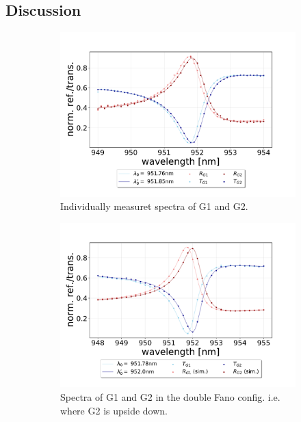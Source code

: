 \subsection{Discussion}

\begin{figure}[h!]
    \centering
    \begin{subfigure}[b]{0.49\textwidth}
        \includegraphics[width=\textwidth]{figures/results/M3:M5/M3:M5_initial_spectra.pdf}
        \caption{Individually measuret spectra of G1 and G2.}
        \label{}
    \end{subfigure}
    \begin{subfigure}[b]{0.49\textwidth}
        \includegraphics[width=\textwidth]{figures/results/M3:M5/M3:M5_spectra_at_measurement.pdf}
        \caption{Spectra of G1 and G2 in the double Fano config. i.e. where G2 is upside down.}
        \label{}
    \end{subfigure}
    \caption{}
    \label{}
\end{figure}

